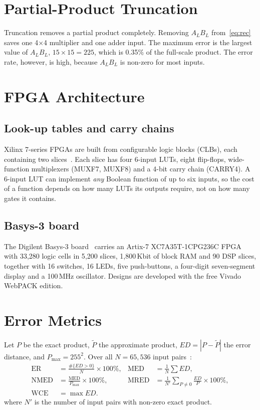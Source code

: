 \documentclass[12pt,a4paper,oneside]{report}
\begin{document}
\section{Partial-Product Truncation}
Truncation removes a partial product completely. Removing $A_LB_L$ from~\eqref{eq:rec} saves one 4$\times$4 multiplier and one adder input. The maximum error is the largest value of $A_LB_L$, $15\times15=225$, which is 0.35\% of the full-scale product. The error rate, however, is high, because $A_LB_L$ is non-zero for most inputs.

\section{FPGA Architecture}
\subsection{Look-up tables and carry chains}
Xilinx 7-series FPGAs are built from configurable logic blocks (CLBs), each containing two slices~\cite{ug474}. Each slice has four 6-input LUTs, eight flip-flops, wide-function multiplexers (MUXF7, MUXF8) and a 4-bit carry chain (CARRY4). A 6-input LUT can implement \emph{any} Boolean function of up to six inputs, so the cost of a function depends on how many LUTs its outputs require, not on how many gates it contains.

\subsection{Basys-3 board}
The Digilent Basys-3 board~\cite{basys3rm} carries an Artix-7 XC7A35T-1CPG236C FPGA with 33{,}280 logic cells in 5{,}200 slices, 1{,}800\,Kbit of block RAM and 90 DSP slices, together with 16 switches, 16 LEDs, five push-buttons, a four-digit seven-segment display and a 100\,MHz oscillator. Designs are developed with the free Vivado WebPACK edition.

\section{Error Metrics}
Let $P$ be the exact product, $\tilde{P}$ the approximate product, $ED=|P-\tilde{P}|$ the error distance, and $P_{\max}=255^2$. Over all $N=65{,}536$ input pairs~\cite{jiang2020survey}:
\begin{align}
\text{ER} &= \frac{\#\{ED>0\}}{N}\times100\%, &
\text{MED} &= \frac{1}{N}\sum ED, \\
\text{NMED} &= \frac{\text{MED}}{P_{\max}}\times100\%, &
\text{MRED} &= \frac{1}{N'}\sum_{P\neq0}\frac{ED}{P}\times100\%, \\
\text{WCE} &= \max ED . &&
\end{align}
where $N'$ is the number of input pairs with non-zero exact product.
\end{document}
